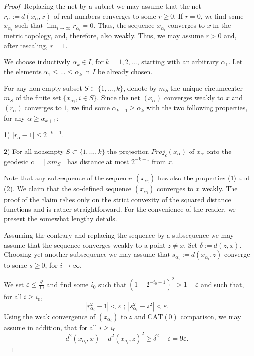 \documentclass[12pt,leqno]{amsart}
\numberwithin{equation}{section}
\theoremstyle{remark}
\newcommand{\CAT}{\mathrm{CAT}}
\begin{document}
\begin{proof}
	Replacing the net by a subnet we may assume that the net $r_{\alpha}\mathrel{:=}d(x_{\alpha},x)$ 
	of real numbers converges to some $r\geq 0$. If $r=0$, we find some $x_{\alpha _i}$ such that $\lim _{i\to \infty} r_{\alpha_i} =0$. Thus, the sequence $x_{\alpha _i}$ converges to $x$ in the metric topology, and, therefore, also weakly. 
Thus, we may assume $r>0$ and, after rescaling, $r=1$. 

We choose inductively $\alpha _k \in I$, for $k=1,2,...$, starting with an arbitrary $\alpha _1$. Let the elements $\alpha _1\leq ...\leq \alpha _k$ in $I$ be already chosen.	 

For any non-empty subset $S \subset \{1,...,k\}$, denote by $m_S$ the unique circumcenter $m_S$ of the finite set $\{x_{\alpha _i}, i\in S\}$.
Since the net $(x_{\alpha})$ converges weakly to $x$ and $(r_{\alpha})$ converges to $1$, we find some $\alpha _{k+1} \geq \alpha _k$ with the two following properties, for any $\alpha \geq \alpha _{k+1}$: 

1) $|r_{\alpha} -1| \leq 2^{-k-1}$.

2) For all nonempty $S\subset \{1,...,k\}$ the projection $Proj _c (x_{\alpha})$ of $x_{\alpha}$ onto the geodesic
$c=[xm_S]$ has distance at most $2^{-k-1}$ from $x$.

Note that any subsequence of the sequence $(x_{\alpha_i})$ has also the properties (1) and (2). 
We claim that the so-defined sequence $(x_{\alpha _i})$ converges to $x$ weakly. 
The proof of the claim relies only on the strict convexity of the squared distance functions
and is rather straightforward.
For the convenience of the reader, we present the somewhat lengthy details. 

Assuming the contrary and replacing the sequence by a subsequence we may assume that the sequence converges weakly to a point $z\neq x$.
Set $\delta\mathrel{:=} d(z,x)$.
Choosing yet another subsequence we may assume that $s_{\alpha_i}\mathrel{:=} d(x_{\alpha_i} , z)$ converge to some $s \geq 0$, for $i\to \infty$. 

We set $\varepsilon \leq \frac {\delta ^2} {10}$ and find some $i_0$ such that 
$(1- 2^{-i_0-1})^2 > 1 -\varepsilon$ and such that, for all $i \geq i_0$,
$$|r_{\alpha_i} ^2 -1| <\varepsilon \; ; \; |s_{\alpha_i} ^2-s^2| <\varepsilon . $$
Using the weak convergence of $(x_{\alpha_i})$ to $z$ and $\CAT(0)$ comparison, we may assume in addition, that for all $i\geq i_0$ 
$$d^2(x_{\alpha _i}, x) -d^2(x_{\alpha_i} ,z) ^2 \geq	\delta ^2 -\varepsilon = 9 \varepsilon .$$


\end{proof}
\end{document}
